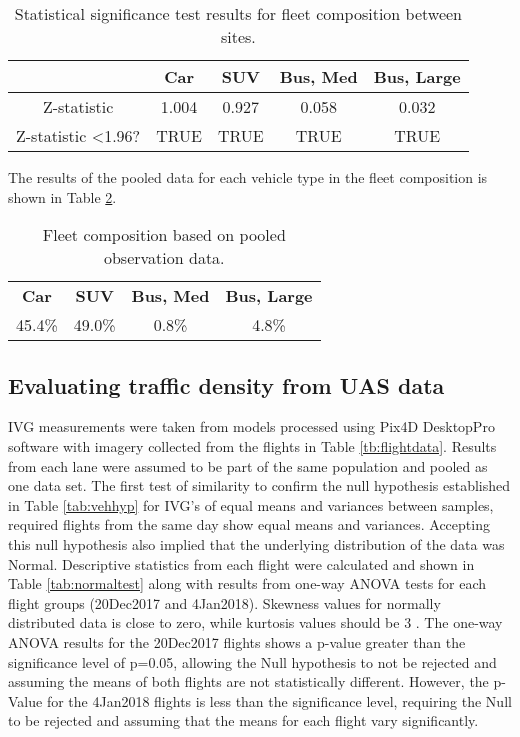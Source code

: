 \documentclass[preprint,12pt,a4paper,authoryear]{elsarticle}
\begin{document}
\begin{linenumbers}
\begin{table}[H]
\centering
\caption{Statistical significance test results for fleet composition between sites.}
\label{tab:fleettest}
\begin{tabular}{@{}ccccc@{}}
\toprule
\textbf{} & \textbf{Car} & \textbf{SUV} & \textbf{Bus, Med} & \textbf{Bus, Large} \\ \midrule
Z-statistic & 1.004 & 0.927 & 0.058 & 0.032 \\
Z-statistic \textless 1.96? & TRUE & TRUE & TRUE & TRUE \\ \bottomrule
\end{tabular}
\end{table}

The results of the pooled data for each vehicle type in the fleet composition is shown in Table \ref{tab:pooledfleet}.

\begin{table}[H]
\centering
\caption{Fleet composition based on pooled observation data.}
\label{tab:pooledfleet}
\begin{tabular}{cccc}
\textbf{Car} & \textbf{SUV} & \textbf{Bus, Med} & \textbf{Bus, Large} \\
45.4\% & 49.0\% & 0.8\% & 4.8\%
\end{tabular}
\end{table}

\subsection{Evaluating traffic density from UAS data}

IVG measurements were taken from models processed using Pix4D DesktopPro software with  imagery collected from the flights in Table \ref{tb:flightdata}.  Results from each lane were assumed to be part of the same population and pooled as one data set. The first test of similarity to confirm the null hypothesis established in Table \ref{tab:vehhyp} for IVG's of equal means and variances between samples, required flights from the same day show equal means and variances. Accepting this null hypothesis also implied that the underlying distribution of the data was Normal.  Descriptive statistics from each flight were calculated and shown in Table \ref{tab:normaltest} along with results from one-way ANOVA tests for each flight groups (20Dec2017 and 4Jan2018). Skewness values for normally distributed data is close to zero, while kurtosis values should be 3 \citep{NIST2013}. The one-way ANOVA results for the 20Dec2017 flights shows a p-value greater than the significance level of p=0.05, allowing the Null hypothesis to not be rejected and assuming the means of both flights are not statistically different. However, the p-Value for the 4Jan2018 flights is less than the significance level, requiring the Null to be rejected and assuming that the means for each flight vary significantly.


\end{linenumbers}
\end{document}
